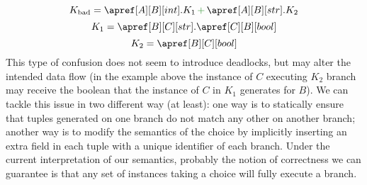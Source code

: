 \hsl
  \[
    K_\mathrm{bad} = \apref[A][B][int].K_1 \chop \apref[A][B][str].K_2
  \]
  \[
    K_1 = \apref[B][C][str].\apref[C][B][bool]
  \]
  \[
    K_2 = \apref[B][C][bool]
  \]
  This type of confusion does not seem to introduce deadlocks, but may
  alter the intended data flow (in the example above the instance of
  $C$ executing $K_2$ branch may receive the boolean that the instance
  of $C$ in $K_1$ generates for $B$).
  We can tackle this issue in two different way (at least): one way is
  to statically ensure that tuples generated on one branch do not
  match any other on another branch; another way is to modify the
  semantics of the choice by implicitly inserting an extra field in
  each tuple with a unique identifier of each branch.
  \newline
  Under the current interpretation of our semantics, probably the
  notion of correctness we can guarantee is that any set of instances
  taking a choice will fully execute a branch.



